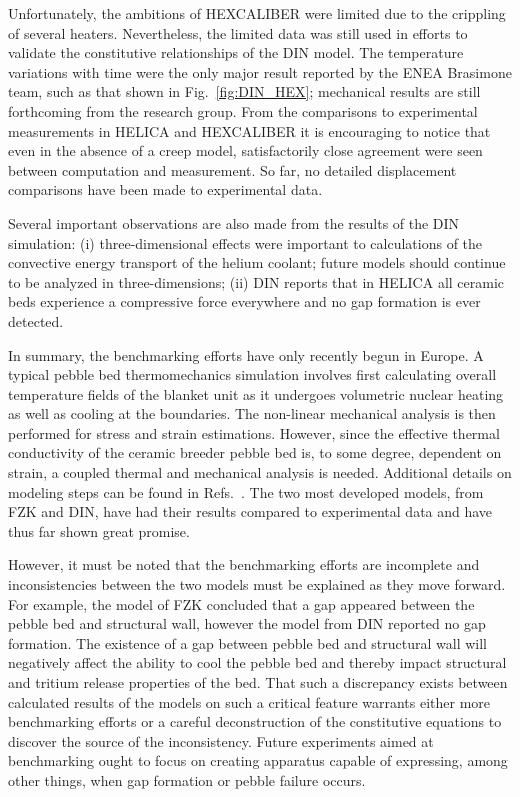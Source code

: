 Unfortunately, the ambitions of HEXCALIBER were limited due to the crippling of several heaters. Nevertheless, the limited data was still used in efforts to validate the constitutive relationships of the DIN model. The temperature variations with time were the only major result reported by the ENEA Brasimone team, such as that shown in Fig.~\ref{fig:DIN_HEX}; mechanical results are still forthcoming from the research group. From the comparisons to experimental measurements in HELICA and HEXCALIBER it is encouraging to notice that even in the absence of a creep model, satisfactorily close agreement were seen between computation and measurement. So far, no detailed displacement comparisons have been made to experimental data.

Several important observations are also made from the results of the DIN simulation: (i) three-dimensional effects were important to calculations of the convective energy transport of the helium coolant; future models should continue to be analyzed in three-dimensions; (ii) DIN reports that in HELICA all ceramic beds experience a compressive force everywhere and no gap formation is ever detected. 

In summary, the benchmarking efforts have only recently begun in Europe. A typical pebble bed thermomechanics simulation involves first calculating overall temperature fields of the blanket unit as it undergoes volumetric nuclear heating as well as cooling at the boundaries. The non-linear mechanical analysis is then performed for stress and strain estimations. However, since the effective thermal conductivity of the ceramic breeder pebble bed is, to some degree, dependent on strain, a coupled thermal and mechanical analysis is needed. Additional details on modeling steps can be found in Refs.~\cite{DellOrco:2010zr,DiMaio20081287,DiMaio20101234,Gan:2009vn,Gan:2010lh,dellorco:2006}. The two most developed models, from FZK and DIN, have had their results compared to experimental data and have thus far shown great promise. 

However, it must be noted that the benchmarking efforts are incomplete and inconsistencies between the two models must be explained as they move forward. For example, the model of FZK concluded that a gap appeared between the pebble bed and structural wall, however the model from DIN reported no gap formation. The existence of a gap between pebble bed and structural wall will negatively affect the ability to cool the pebble bed and thereby impact structural and tritium release properties of the bed. That such a discrepancy exists between calculated results of the models on such a critical feature warrants either more benchmarking efforts or a careful deconstruction of the constitutive equations to discover the source of the inconsistency. Future experiments aimed at benchmarking ought to focus on creating apparatus capable of expressing, among other things, when gap formation or pebble failure occurs.


